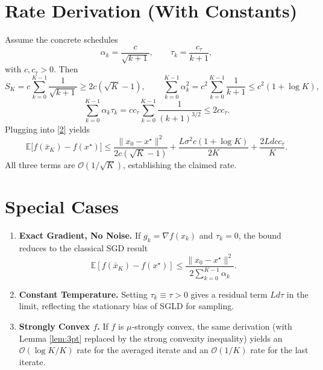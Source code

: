 \documentclass{article}
\newcommand{\E}{\mathbb{E}}
\begin{document}
\section*{Rate Derivation (With Constants)}
Assume the concrete schedules
\[
\alpha_{k}= \frac{c}{\sqrt{k+1}},\qquad \tau_{k}= \frac{c_{\tau}}{k+1},
\]
with $c,c_{\tau}>0$. Then
\[
S_{K}=c\sum_{k=0}^{K-1}\frac{1}{\sqrt{k+1}}
\ge 2c(\sqrt{K}-1),\qquad 
\sum_{k=0}^{K-1}\alpha_{k}^{2}=c^{2}\sum_{k=0}^{K-1}\frac{1}{k+1}\le c^{2}(1+\log K),
\]
\[
\sum_{k=0}^{K-1}\alpha_{k}\tau_{k}=c c_{\tau}\sum_{k=0}^{K-1}\frac{1}{(k+1)^{3/2}}\le 2c c_{\tau}.
\]
Plugging into \eqref{2} yields
\[
\E\!\big[f(\bar x_{K})-f(x^{\star})\big]
\le 
\frac{\|x_{0}-x^{\star}\|^{2}}{2c(\sqrt{K}-1)}
+\frac{L\sigma^{2}c(1+\log K)}{2K}
+\frac{2L d c c_{\tau}}{K}.
\]
All three terms are $\mathcal O(1/\sqrt{K})$, establishing the claimed rate.

\section*{Special Cases}
\begin{enumerate}[nosep]
\item \textbf{Exact Gradient, No Noise.} If $g_{k}=\nabla f(x_{k})$ and $\tau_{k}=0$, the bound reduces to the classical SGD result
\[
\E[f(\bar x_{K})-f(x^{\star})]\le\frac{\|x_{0}-x^{\star}\|^{2}}{2\sum_{k=0}^{K-1}\alpha_{k}}.
\]
\item \textbf{Constant Temperature.} Setting $\tau_{k}\equiv\tau>0$ gives a residual term $L d\tau$ in the limit, reflecting the stationary bias of SGLD for sampling.
\item \textbf{Strongly Convex $f$.} If $f$ is $\mu$‑strongly convex, the same derivation (with Lemma \ref{lem:3pt} replaced by the strong convexity inequality) yields an $\mathcal O(\log K/K)$ rate for the averaged iterate and an $\mathcal O(1/K)$ rate for the last iterate.
\end{enumerate}
\end{document}
